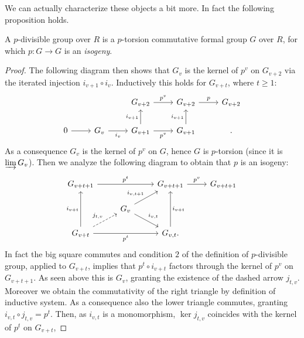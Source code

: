 \documentclass[../Main]{subfiles}
\begin{document}
We can actually characterize these objects a bit more. 
In fact the following proposition holds.
\begin{prop}\label{CharactpDivGroups}%
	A $p$-divisible group over $R$ is a $p$-torsion
	commutative formal group $G$ over $R$,
	for which $p\colon G \to G$ is an {\em isogeny}.
\end{prop}
\begin{proof}
	The following diagram then shows that $G_v$ is the kernel of $p^v$
	on $G_{v+2}$ via the iterated injection $i_{v+1} \circ i_v$.
	Inductively this holds for $G_{v+t}$, where $t \geq 1$:
	\begin{equation*}
	\begin{tikzcd}
		&
		&
		G_{v+2} \arrow[r, "p^v", rightarrow] &
		G_{v+2} \arrow[r, "p", rightarrow] &
		G_{v+2}\\
		0 \arrow[r, "", rightarrow] &
		G_{v} \arrow[r, "i_v"', rightarrow] &
		G_{v+1} \arrow[r, "p^v"', rightarrow] 
		\arrow[u, "i_{v+1}", rightarrow] &
		G_{v+1} \arrow[u, "i_{v+1}", rightarrow] &
	.\end{tikzcd}
	\end{equation*}
	As a consequence $G_v$ is the kernel of $p^v$ on $G$,
	hence $G$ is $p$-torsion (since it is $\varinjlim G_v$).
	Then we analyze the following diagram to obtain that $p$
	is an isogeny:
	\begin{equation*}
	\begin{tikzcd}[row sep=1.4em]
		G_{v+t+1} \arrow[rr, "p^t", rightarrow] & &
		G_{v+t+1} \arrow[r, "p^v", rightarrow] &
		G_{v+t+1}\\
		&
		G_v \arrow[ru, "i_{v,t+1}", rightarrow] 
		\arrow[rd, "i_{v,t}", rightarrow] 
		& & \\
		G_{v+t} \arrow[ru, "j_{t,v}", dashrightarrow] 
		\arrow[rr, "p^t"', rightarrow]
		\arrow[uu, "i_{v+t}", rightarrow] & &
		G_{v,t} \arrow[uu, "i_{v+t}"', rightarrow]
	.\end{tikzcd}
	\end{equation*}
	In fact the big square commutes and condition $2$ of the definition
	of $p$-divisible group, applied to $G_{v+t}$, implies that $p^t \circ i_{v+t}$
	factors through the kernel of $p^v$ on $G_{v+t+1}$.
	As seen above this is $G_v$, granting the existence of the 
	dashed arrow $j_{t,v}$.
	Moreover we obtain the commutativity of the right triangle by
	definition of inductive system.
	As a consequence also the lower triangle commutes, granting
	$i_{v,t} \circ j_{t,v} = p^t$.
	Then, as $i_{v,t}$ is a monomorphism, $\ker j_{t,v}$
	coincides with the kernel of $p^t$ on $G_{v+t}$, 

\end{proof}
\end{document}
